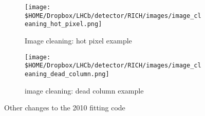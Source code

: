 \begin{figure}
	\begin{subfigure}[b]{0.45\textwidth}
		\texttt{[image: \$HOME/Dropbox/LHCb/detector/RICH/images/image\_cleaning\_hot\_pixel.png]}
		\caption{Image cleaning: hot pixel example}	
		\label{image cleaning: hot pixel}
	\end{subfigure}
	\begin{subfigure}[b]{0.45\textwidth}
		\texttt{[image: \$HOME/Dropbox/LHCb/detector/RICH/images/image\_cleaning\_dead\_column.png]}
		\caption{image cleaning: dead column example}
		\label{image cleaning: dead column}	
	\end{subfigure}
	\caption[Optional caption for list of figures]{Other changes to the 2010 fitting code}	
	\label{fig: Other changes to the 2010 fitting code}
\end{figure}


